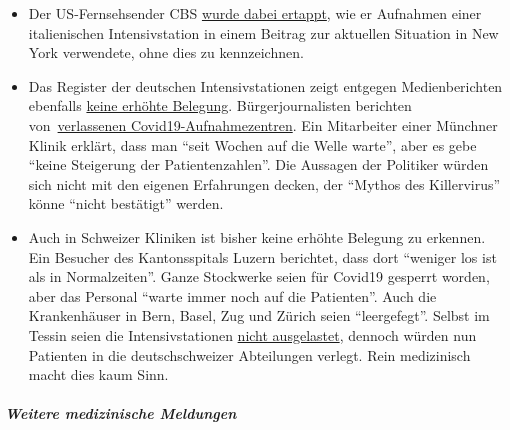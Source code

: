 \begin{itemize}
\tightlist
\item
  Der US-Fernsehsender CBS
  \href{https://nypost.com/2020/04/01/cbs-admits-to-using-footage-from-italy-in-report-about-nyc/}{wurde
  dabei ertappt}, wie er Aufnahmen einer italienischen Intensivstation
  in einem Beitrag zur aktuellen Situation in New York verwendete, ohne
  dies zu kennzeichnen.
\item
  Das Register der deutschen Intensivstationen zeigt entgegen
  Medienberichten ebenfalls
  \href{https://www.intensivregister.de/\#/intensivregister}{keine
  erhöhte Belegung}. Bürgerjournalisten berichten
  von~\href{https://www.in-opr.de/2020/03/28/coronakrise-und-ruppiner-kliniken-was-stimmt-hier-nicht/}{verlassenen
  Covid19-Aufnahme­zentren}. Ein Mitarbeiter einer Münchner Klinik
  erklärt, dass man ``seit Wochen auf die Welle warte'', aber es gebe
  ``keine Steigerung der Patienten­zahlen''. Die Aussagen der Politiker
  würden sich nicht mit den eigenen Erfahrungen decken, der ``Mythos des
  Killervirus'' könne ``nicht bestätigt'' werden.
\item
  Auch in Schweizer Kliniken ist bisher keine erhöhte Belegung zu
  erkennen. Ein Besucher des Kantons­spitals Luzern berichtet, dass dort
  ``weniger los ist als in Norma­lzeiten''. Ganze Stockwerke seien für
  Covid19 gesperrt worden, aber das Personal ``warte immer noch auf die
  Patienten''. Auch die Krankenhäuser in Bern, Basel, Zug und Zürich
  seien ``leergefegt''. Selbst im Tessin seien die Intensivstationen
  \href{https://www.nzz.ch/schweiz/tessin-verlegt-erste-corona-patienten-in-deutschschweizer-spitaeler-ld.1549417}{nicht
  ausgelastet}, dennoch würden nun Patienten in die deutschschweizer
  Abteilungen verlegt. Rein medizinisch macht dies kaum Sinn.
\end{itemize}

\hypertarget{weitere-medizinische-meldungen-2}{%
\subparagraph{\texorpdfstring{\textbf{Weitere medizinische
Meldungen}}{Weitere medizinische Meldungen}}\label{weitere-medizinische-meldungen-2}}

